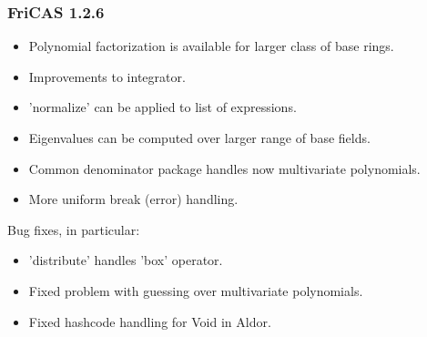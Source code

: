 \subsubsection{FriCAS 1.2.6}
\begin{itemize}

\item Polynomial factorization is available for larger class
      of base rings.

\item Improvements to integrator.

\item 'normalize' can be applied to list of expressions.

\item Eigenvalues can be computed over larger range of base fields.

\item Common denominator package handles now multivariate polynomials.

\item More uniform break (error) handling.

\end{itemize}

Bug fixes, in particular:

\begin{itemize}

\item 'distribute' handles 'box' operator.

\item Fixed problem with guessing over multivariate polynomials.

\item Fixed hashcode handling for Void in Aldor.

\end{itemize}

